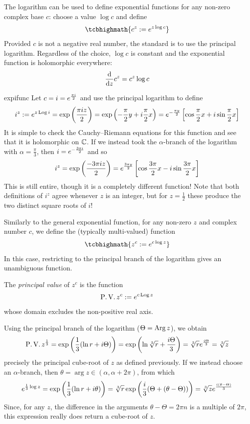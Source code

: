 
The logarithm can be used to define exponential functions for any non-zero complex base $c$: choose a value $\log c$ and define
\[\tcbhighmath{c^z:=e^{z\log c}}\]
Provided $c$ is not a negative real number, the standard is to use the principal logarithm. Regardless of the choice, $\log c$ is constant and the exponential function is holomorphic everywhere:
\[\frac{\mathrm{d} }{\mathrm{d} z}c^z=c^z\log c\]

\begin{example}{}{expifunc}
Let $c=i=e^{\frac{\pi i}{2}}$ and use the principal logarithm to define
\[i^z:=e^{z\operatorname{Log} i}=\exp\left(\frac{\pi iz}2\right) =\exp\left(-\frac\pi 2y+i\frac\pi 2x\right) =e^{-\frac{\pi y}{2}}\left[\cos\frac\pi 2x+i\sin\frac\pi 2x\right]\]
It is simple to check the Cauchy--Riemann equations for this function and see that it is holomorphic on $\mathbb{C}$.\smallbreak
If we instead took the $\alpha$-branch of the logarithm with $\alpha=\frac\pi 3$, then $i=e^{-\frac{3\pi i}{2}}$ and so
\[i^z=\exp\left(\frac{-3\pi iz}2\right) =e^{\frac{3\pi y}{2}}\left[\cos\frac{3\pi}2x-i\sin\frac{3\pi}2x\right]\]
This is still entire, though it is a completely different function! Note that both definitions of $i^z$ agree whenever $z$ is an integer, but for $z=\frac 12$ these produce the two distinct square roots of $i$!
\end{example}
\goodbreak


Similarly to the general exponential function, for any non-zero $z$ and complex number $c$, we define the (typically multi-valued) function
\[\tcbhighmath{z^c:=e^{c\log z}}\]
In this case, restricting to the principal branch of the logarithm gives an unambiguous function.

\begin{defn}{}{}
The \emph{principal value} of $z^c$ is the function
\[\operatorname{P.V.}z^c:=e^{c\operatorname{Log} z}\]
whose domain excludes the non-positive real axis.
\end{defn}



\begin{example}{}{}
Using the principal branch of the logarithm ($\Theta=\operatorname{Arg} z$), we obtain
\[\operatorname{P.V.}z^{\frac 13}=\exp\left(\frac 13(\ln r+i\Theta)\right) =\exp\left(\ln \sqrt[3]{r}+\frac{i\Theta}3\right)=\sqrt[3]{r}e^{\frac{i\Theta}{3}} =\sqrt[3]{z}\]
precisely the principal cube-root of $z$ as defined previously.\smallbreak
If we instead choose an $\alpha$-branch, then $\theta=\arg z\in(\alpha,\alpha+2\pi)$, from which
\[e^{\frac 13\log z}=\exp\left(\frac 13(\ln r+i\theta)\right) =\sqrt[3]{r}\exp\left(\frac i3(\Theta+(\theta-\Theta))\right) =\sqrt[3]{z}e^{\frac{i(\theta-\Theta)}{3}}\]
Since, for any $z$, the difference in the arguments $\theta-\Theta=2\pi n$ is a multiple of $2\pi$, this expression really does return a cube-root of $z$.
\end{example}

